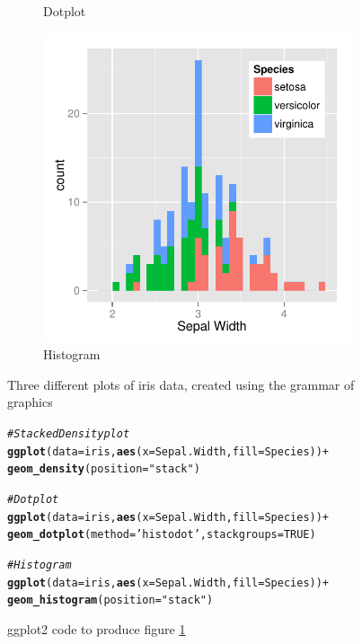 \documentclass[11pt]{isuthesis}\usepackage[]{graphicx}\usepackage[]{color}
\makeatletter
\newcommand{\hlnum}[1]{\textcolor[rgb]{0.686,0.059,0.569}{#1}}%
\newcommand{\hlstr}[1]{\textcolor[rgb]{0.192,0.494,0.8}{#1}}%
\newcommand{\hlcom}[1]{\textcolor[rgb]{0.678,0.584,0.686}{\textit{#1}}}%
\newcommand{\hlopt}[1]{\textcolor[rgb]{0,0,0}{#1}}%
\newcommand{\hlstd}[1]{\textcolor[rgb]{0.345,0.345,0.345}{#1}}%
\newcommand{\hlkwc}[1]{\textcolor[rgb]{0.333,0.667,0.333}{#1}}%
\newcommand{\hlkwd}[1]{\textcolor[rgb]{0.737,0.353,0.396}{\textbf{#1}}}%
\newenvironment{kframe}{%
 \def\at@end@of@kframe{}%
 \ifinner\ifhmode%
  \def\at@end@of@kframe{\end{minipage}}%
  \begin{minipage}{\columnwidth}%
 \fi\fi%
 \def\FrameCommand##1{\hskip\@totalleftmargin \hskip-\fboxsep
 \colorbox{shadecolor}{##1}\hskip-\fboxsep
     \hskip-\linewidth \hskip-\@totalleftmargin \hskip\columnwidth}%
 \MakeFramed {\advance\hsize-\width
   \@totalleftmargin\z@ \linewidth\hsize
   \@setminipage}}%
 {\par\unskip\endMakeFramed%
 \at@end@of@kframe}
\newenvironment{knitrout}{}{} %
\makeatother
\begin{document}
\begin{figure}[htbp]
\begin{subfigure}[b]{.33\textwidth}
  \caption{Dotplot}
\end{subfigure}\hfill
\begin{subfigure}[b]{.33\textwidth}\centering
  \includegraphics[width=\textwidth]{fig-irisdatagrammar3}
  \caption{Histogram}
\end{subfigure}\hfill
\caption{Three different plots of iris data, created using the grammar of graphics}\label{fig:grammarplots}
\end{figure}

\begin{figure}[htbp]\centering
\begin{knitrout}
\color{fgcolor}\begin{kframe}
\begin{alltt}
\hlcom{# Stacked Density plot}
\hlkwd{ggplot}\hlstd{(}\hlkwc{data}\hlstd{=iris,} \hlkwd{aes}\hlstd{(}\hlkwc{x}\hlstd{=Sepal.Width,} \hlkwc{fill}\hlstd{=Species))} \hlopt{+}
  \hlkwd{geom_density}\hlstd{(}\hlkwc{position}\hlstd{=}\hlstr{"stack"}\hlstd{)}

\hlcom{# Dotplot }
\hlkwd{ggplot}\hlstd{(}\hlkwc{data}\hlstd{=iris,} \hlkwd{aes}\hlstd{(}\hlkwc{x}\hlstd{=Sepal.Width,} \hlkwc{fill}\hlstd{=Species))} \hlopt{+}
  \hlkwd{geom_dotplot}\hlstd{(}\hlkwc{method}\hlstd{=}\hlstr{'histodot'}\hlstd{,} \hlkwc{stackgroups}\hlstd{=}\hlnum{TRUE}\hlstd{)}

\hlcom{# Histogram}
\hlkwd{ggplot}\hlstd{(}\hlkwc{data}\hlstd{=iris,} \hlkwd{aes}\hlstd{(}\hlkwc{x}\hlstd{=Sepal.Width,} \hlkwc{fill}\hlstd{=Species))} \hlopt{+}
  \hlkwd{geom_histogram}\hlstd{(}\hlkwc{position}\hlstd{=}\hlstr{"stack"}\hlstd{)}
\end{alltt}
\end{kframe}
\end{knitrout}
\caption{ggplot2 code to produce figure \protect\ref{fig:grammarplots}}\label{fig:grammarcode}
\end{figure}
\end{document}
